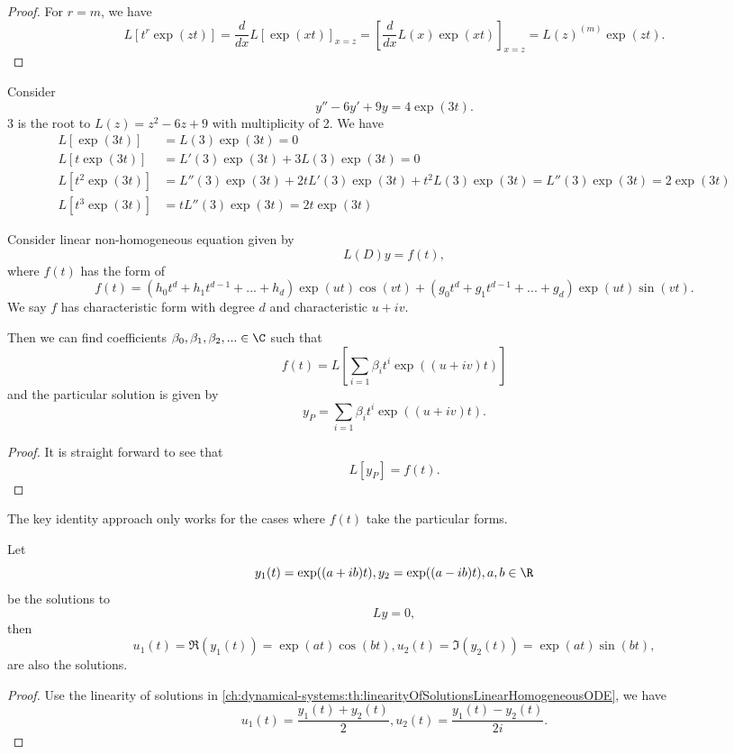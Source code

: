 \begin{refsection}
\begin{proof}
For $r = m$, we have 
$$L[t^r\exp(zt)] = \frac{d}{dx}L[\exp(xt)]_{x=z} = [\frac{d}{dx}L(x)\exp(xt)]_{x=z} = L(z)^{(m)}\exp(zt).$$
\end{proof}

\begin{example}
	Consider $$y''-6y'+9y = 4\exp(3t).$$
	3 is the root to $L(z)=z^2-6z+9$ with multiplicity of 2.
	We have
	\begin{align*}
	L[\exp(3t)] &= L(3)\exp(3t) = 0 \\
	L[t\exp(3t)] &= L'(3)\exp(3t) + 3L(3)\exp(3t) = 0 \\
	L[t^2\exp(3t)] &= L''(3)\exp(3t) + 2tL'(3)\exp(3t) + t^2L(3)\exp(3t) = L''(3)\exp(3t) =  2\exp(3t) \\
	L[t^3\exp(3t)] &= tL''(3)\exp(3t) = 2t\exp(3t) 
	\end{align*}
\end{example}


\begin{theorem}\label{ch:dynamical-systems:th:KeyIdentityApproachParticularSolutionNonhomogeneouslinearODE}
Consider linear non-homogeneous equation given by $$L(D)y = f(t),$$
where $f(t)$ has the form of
$$f(t)=(h_0 t^d+h_1t^{d-1}+...+h_d)\exp(u t)\cos(vt) + (g_0 t^d+g_1t^{d-1}+...+g_d)\exp(u t)\sin(vt).$$
We say $f$ has characteristic form with degree $d$ and characteristic $u+i v$.

Then we can find coefficients $\beta_0,\beta_1,\beta_2,... \in \C$ such that
$$f(t) = L[\sum_{i=1} \beta_i t^{i}\exp((u+iv)t)]$$ and the particular solution is given by
$$y_P = \sum_{i=1} \beta_i  t^{i}\exp((u+iv)t).$$
\end{theorem}
\begin{proof}
It is straight forward to see that $$L[y_P] = f(t).$$
\end{proof}

\begin{remark}
The key identity approach only works for the cases where $f(t)$ take the particular forms.
\end{remark}




\begin{lemma}\label{ch:dynamical-systems:th:ConversionTrigonometricFunctionsAndComplexExponentialsForcingTerms} 
	Let
	$$y_1(t)=\exp((a+ib)t),y_2=\exp((a-ib)t),a,b\in \R$$	
	be the solutions to 
	$$Ly = 0,$$
	then
	$$u_1(t) =\Re(y_1(t))= \exp(at)\cos(bt), u_2(t)= \Im(y_2(t)) = \exp(at)\sin(bt),$$
	are also the solutions.	
\end{lemma}
\begin{proof}
	Use the linearity of solutions in \autoref{ch:dynamical-systems:th:linearityOfSolutionsLinearHomogeneousODE}, we have
	$$u_1(t) = \frac{y_1(t) + y_2(t)}{2},u_2(t) = \frac{y_1(t) - y_2(t)}{2i}.$$
\end{proof}


\end{refsection}

